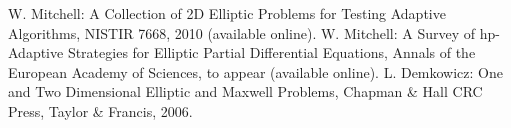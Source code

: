 \documentclass[12pt]{elsarticle}
\begin{document}
\begin{thebibliography}{[KLR73]}

W. Mitchell: A Collection of 2D Elliptic Problems for
Testing Adaptive Algorithms, NISTIR 7668, 2010 (available online).
\vspace{-2mm}
W. Mitchell: A Survey of hp-Adaptive Strategies for Elliptic Partial Differential Equations,
Annals of the European Academy of Sciences, to appear (available online).
\vspace{-2mm}
L. Demkowicz: One and Two Dimensional Elliptic and Maxwell Problems,
Chapman \& Hall \/ CRC Press, Taylor \& Francis, 2006.

%
%
%
\end{thebibliography}

\end{document}
